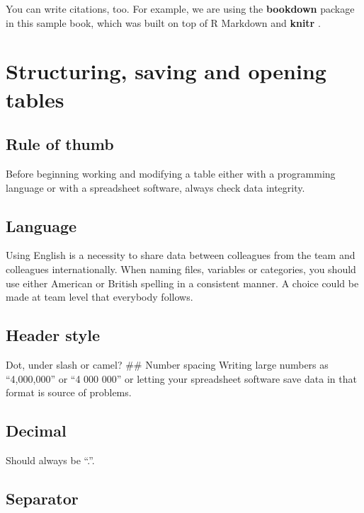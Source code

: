 \documentclass[
]{book}
\begin{document}
You can write citations, too. For example, we are using the \textbf{bookdown} package \citep{R-bookdown} in this sample book, which was built on top of R Markdown and \textbf{knitr} \citep{xie2015}.

\hypertarget{structuring-saving-and-opening-tables}{%
\chapter{Structuring, saving and opening tables}\label{structuring-saving-and-opening-tables}}

\hypertarget{rule-of-thumb}{%
\section{Rule of thumb}\label{rule-of-thumb}}

Before beginning working and modifying a table either with a programming language or with a spreadsheet software, always check data integrity.

\hypertarget{language}{%
\section{Language}\label{language}}

Using English is a necessity to share data between colleagues from the team and colleagues internationally. When naming files, variables or categories, you should use either American or British spelling in a consistent manner. A choice could be made at team level that everybody follows.

\hypertarget{header-style}{%
\section{Header style}\label{header-style}}

Dot, under slash or camel?
\#\# Number spacing
Writing large numbers as ``4,000,000'' or ``4 000 000'' or letting your spreadsheet software save data in that format is source of problems.

\hypertarget{decimal}{%
\section{Decimal}\label{decimal}}

Should always be ``.''.

\hypertarget{separator}{%
\section{Separator}\label{separator}}
\end{document}
